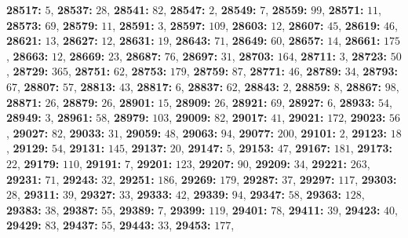\textsf{\bfseries 28517:} $5$, \textsf{\bfseries 28537:} $28$, \textsf{\bfseries 28541:} $82$, \textsf{\bfseries 28547:} $2$, \textsf{\bfseries 28549:} $7$, \textsf{\bfseries 28559:} $99$, \textsf{\bfseries 28571:} $11$, \textsf{\bfseries 28573:} $69$, \textsf{\bfseries 28579:} $11$, \textsf{\bfseries 28591:} $3$, \textsf{\bfseries 28597:} $109$, \textsf{\bfseries 28603:} $12$, \textsf{\bfseries 28607:} $45$, \textsf{\bfseries 28619:} $46$, \textsf{\bfseries 28621:} $13$, \textsf{\bfseries 28627:} $12$, \textsf{\bfseries 28631:} $19$, \textsf{\bfseries 28643:} $71$, \textsf{\bfseries 28649:} $60$, \textsf{\bfseries 28657:} $14$, \textsf{\bfseries 28661:} $175$, \textsf{\bfseries 28663:} $12$, \textsf{\bfseries 28669:} $23$, \textsf{\bfseries 28687:} $76$, \textsf{\bfseries 28697:} $31$, \textsf{\bfseries 28703:} $164$, \textsf{\bfseries 28711:} $3$, \textsf{\bfseries 28723:} $50$, \textsf{\bfseries 28729:} $365$, \textsf{\bfseries 28751:} $62$, \textsf{\bfseries 28753:} $179$, \textsf{\bfseries 28759:} $87$, \textsf{\bfseries 28771:} $46$, \textsf{\bfseries 28789:} $34$, \textsf{\bfseries 28793:} $67$, \textsf{\bfseries 28807:} $57$, \textsf{\bfseries 28813:} $43$, \textsf{\bfseries 28817:} $6$, \textsf{\bfseries 28837:} $62$, \textsf{\bfseries 28843:} $2$, \textsf{\bfseries 28859:} $8$, \textsf{\bfseries 28867:} $98$, \textsf{\bfseries 28871:} $26$, \textsf{\bfseries 28879:} $26$, \textsf{\bfseries 28901:} $15$, \textsf{\bfseries 28909:} $26$, \textsf{\bfseries 28921:} $69$, \textsf{\bfseries 28927:} $6$, \textsf{\bfseries 28933:} $54$, \textsf{\bfseries 28949:} $3$, \textsf{\bfseries 28961:} $58$, \textsf{\bfseries 28979:} $103$, \textsf{\bfseries 29009:} $82$, \textsf{\bfseries 29017:} $41$, \textsf{\bfseries 29021:} $172$, \textsf{\bfseries 29023:} $56$, \textsf{\bfseries 29027:} $82$, \textsf{\bfseries 29033:} $31$, \textsf{\bfseries 29059:} $48$, \textsf{\bfseries 29063:} $94$, \textsf{\bfseries 29077:} $200$, \textsf{\bfseries 29101:} $2$, \textsf{\bfseries 29123:} $18$, \textsf{\bfseries 29129:} $54$, \textsf{\bfseries 29131:} $145$, \textsf{\bfseries 29137:} $20$, \textsf{\bfseries 29147:} $5$, \textsf{\bfseries 29153:} $47$, \textsf{\bfseries 29167:} $181$, \textsf{\bfseries 29173:} $22$, \textsf{\bfseries 29179:} $110$, \textsf{\bfseries 29191:} $7$, \textsf{\bfseries 29201:} $123$, \textsf{\bfseries 29207:} $90$, \textsf{\bfseries 29209:} $34$, \textsf{\bfseries 29221:} $263$, \textsf{\bfseries 29231:} $71$, \textsf{\bfseries 29243:} $32$, \textsf{\bfseries 29251:} $186$, \textsf{\bfseries 29269:} $179$, \textsf{\bfseries 29287:} $37$, \textsf{\bfseries 29297:} $117$, \textsf{\bfseries 29303:} $28$, \textsf{\bfseries 29311:} $39$, \textsf{\bfseries 29327:} $33$, \textsf{\bfseries 29333:} $42$, \textsf{\bfseries 29339:} $94$, \textsf{\bfseries 29347:} $58$, \textsf{\bfseries 29363:} $128$, \textsf{\bfseries 29383:} $38$, \textsf{\bfseries 29387:} $55$, \textsf{\bfseries 29389:} $7$, \textsf{\bfseries 29399:} $119$, \textsf{\bfseries 29401:} $78$, \textsf{\bfseries 29411:} $39$, \textsf{\bfseries 29423:} $40$, \textsf{\bfseries 29429:} $83$, \textsf{\bfseries 29437:} $55$, \textsf{\bfseries 29443:} $33$, \textsf{\bfseries 29453:} $177$, 
